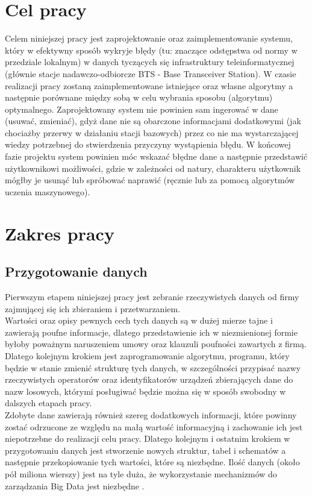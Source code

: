 \documentclass[eng,printmode]{mgr}
\begin{document}
\section{Cel pracy}
Celem niniejszej pracy jest zaprojektowanie oraz zaimplementowanie systemu, który w efektywny sposób wykryje błędy (tu: znaczące odstępstwa od normy w przedziale lokalnym) w danych tyczących się infrastruktury teleinformatycznej (głównie stacje nadawczo-odbiorcze BTS - Base Transceiver Station). W czasie realizacji pracy zostaną zaimplementowane istniejące oraz własne algorytmy a następnie porównane między sobą w celu wybrania sposobu (algorytmu) optymalnego. Zaprojektowany system nie powinien sam ingerować w dane (usuwać, zmieniać), gdyż dane nie są obarczone informacjami dodatkowymi (jak chociażby przerwy w działaniu stacji bazowych) przez co nie ma wystarczającej wiedzy potrzebnej do stwierdzenia przyczyny wystąpienia błędu. W końcowej fazie projektu system powinien móc wskazać błędne dane a następnie przedstawić użytkownikowi możliwości, gdzie w zależności od natury, charakteru użytkownik mógłby je usunąć lub spróbować naprawić (ręcznie lub za pomocą algorytmów uczenia maszynowego). 

\section{Zakres pracy}
\subsection{Przygotowanie danych}
Pierwszym etapem niniejszej pracy jest zebranie rzeczywistych danych od firmy zajmującej się ich zbieraniem i przetwarzaniem.  \\
Wartości oraz opisy pewnych cech tych danych są w dużej mierze tajne i zawierają poufne informacje, dlatego przedstawienie ich w niezmienionej formie byłoby poważnym naruszeniem umowy oraz klauzuli poufności zawartych z firmą. \\
Dlatego kolejnym krokiem jest zaprogramowanie algorytmu, programu, który będzie w stanie zmienić strukturę tych danych, w szczególności przypisać nazwy rzeczywistych operatorów oraz identyfikatorów urządzeń zbierających dane do nazw losowych, którymi posługiwać będzie można się w sposób swobodny w dalszych etapach pracy. \\
Zdobyte dane zawierają również szereg dodatkowych informacji, które powinny zostać odrzucone ze względu na małą wartość informacyjną i zachowanie ich jest niepotrzebne do realizacji celu pracy. Dlatego kolejnym i ostatnim krokiem w przygotowaniu danych jest stworzenie nowych struktur, tabel i schematów a następnie przekopiowanie tych wartości, które są niezbędne. Ilość danych (około pół miliona wierszy) jest na tyle duża, że wykorzystanie mechanizmów do zarządzania Big Data jest niezbędne \cite{cassandra}\cite {cassandra-driver}.
\end{document}
